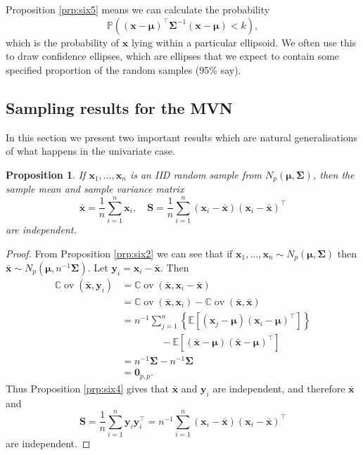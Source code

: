 \documentclass[
]{book}
\newtheorem{proposition}{Proposition}[chapter]
\theoremstyle{definition}
\theoremstyle{definition}
\theoremstyle{definition}
\theoremstyle{definition}
\theoremstyle{remark}
\begin{document}
Proposition \ref{prp:six5} means we can calculate the probability \[{\mathbb{P}}\left((\mathbf x-{\boldsymbol{\mu}})^\top \boldsymbol{\Sigma}^{-1} (\mathbf x-{\boldsymbol{\mu}})<k\right),\] which is the probability of \(\mathbf x\) lying within a particular ellipsoid. We often use this to draw confidence ellipses, which are ellipses that we expect to contain some specified proportion of the random samples (95\% say).

\subsection{Sampling results for the MVN}\label{sampling-results-for-the-mvn}

In this section we present two important results which are natural
generalisations of what happens in the univariate case.

\begin{proposition}
\protect\hypertarget{prp:six6}{}\label{prp:six6}If \(\mathbf x_1, \ldots, \mathbf x_n\) is an IID random sample from \(N_p({\boldsymbol{\mu}}, \boldsymbol{\Sigma})\), then the sample mean and sample variance matrix
\[\bar{\mathbf x} = \frac{1}{n} \sum_{i=1}^n \mathbf x_i, \quad \mathbf S= \frac{1}{n} \sum_{i=1}^n (\mathbf x_i - \bar{\mathbf x})(\mathbf x_i-\bar{\mathbf x})^\top\] are independent.
\end{proposition}

\begin{proof}
From Proposition \ref{prp:six2} we can see that if \(\mathbf x_1, \ldots, \mathbf x_n \sim N_p({\boldsymbol{\mu}}, \boldsymbol{\Sigma})\) then \(\bar{\mathbf x} \sim N_p ({\boldsymbol{\mu}}, n^{-1}\boldsymbol{\Sigma})\). Let \(\mathbf y_i = \mathbf x_i -\bar{\mathbf x}\). Then
\begin{align*}
{\mathbb{C}\operatorname{ov}}(\bar{\mathbf x},\mathbf y_i)&={\mathbb{C}\operatorname{ov}}(\bar{\mathbf x}, \mathbf x_i -\bar{\mathbf x})\\
&={\mathbb{C}\operatorname{ov}}(\bar{\mathbf x}, \mathbf x_i) - {\mathbb{C}\operatorname{ov}}(\bar{\mathbf x}, \bar{\mathbf x})\\
&=n^{-1}\sum_{j=1}^n \left \{{\mathbb{E}}[(\mathbf x_j -{\boldsymbol{\mu}})(\mathbf x_i-{\boldsymbol{\mu}})^\top]\right \}\\
& \qquad \qquad -{\mathbb{E}}[(\bar{\mathbf x}-{\boldsymbol{\mu}})(\bar{\mathbf x}-{\boldsymbol{\mu}})^\top]\\
&=n^{-1}\boldsymbol{\Sigma}- n^{-1}\boldsymbol{\Sigma}\\
&= {\mathbf 0}_{p,p}.
\end{align*}
Thus Proposition \ref{prp:six4} gives that \(\bar{\mathbf x}\) and \(\mathbf y_i\) are independent, and therefore \(\bar{\mathbf x}\) and
\[
\mathbf S=\frac{1}{n}\sum_{i=1}^n \mathbf y_i \mathbf y_i^\top =n^{-1}\sum_{i=1}^n (\mathbf x_i -\bar{\mathbf x})(\mathbf x_i -\bar{\mathbf x})^\top
\]
are independent.
\end{proof}
\end{document}
